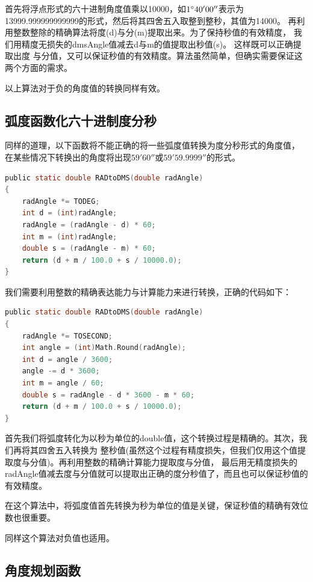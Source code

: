 首先将浮点形式的六十进制角度值乘以10000，如$1^\circ 40'00''$表示为
13999.999999999999的形式，然后将其四舍五入取整到整秒，其值为14000。
再利用整数整除的精确算法将度(d)与分(m)提取出来。为了保持秒值的有效精度，
我们用精度无损失的dmsAngle值减去d与m的值提取出秒值(s)。 这样既可以正确提取出度
与分值，又可以保证秒值的有效精度。算法虽然简单，但确实需要保证这两个方面的需求。

 以上算法对于负的角度值的转换同样有效。


\subsection{弧度函数化六十进制度分秒}

同样的道理，以下函数将不能正确的将一些弧度值转换为度分秒形式的角度值，
在某些情况下转换出的角度将出现$59'60''$或$59'59.9999''$的形式。

\begin{lstlisting}[language=C]
public static double RADtoDMS(double radAngle)
{
    radAngle *= TODEG;
    int d = (int)radAngle;
    radAngle = (radAngle - d) * 60;
    int m = (int)radAngle;
    double s = (radAngle - m) * 60;
    return (d + m / 100.0 + s / 10000.0);
}
\end{lstlisting}

我们需要利用整数的精确表达能力与计算能力来进行转换，正确的代码如下：

\begin{lstlisting}[language=C]
public static double RADtoDMS(double radAngle)
{
    radAngle *= TOSECOND;
    int angle = (int)Math.Round(radAngle); 
    int d = angle / 3600;
    angle -= d * 3600;
    int m = angle / 60;
    double s = radAngle - d * 3600 - m * 60;
    return (d + m / 100.0 + s / 10000.0);
}
\end{lstlisting}

首先我们将弧度转化为以秒为单位的double值，这个转换过程是精确的。其次，我们再将其四舍五入转换为
整秒值(虽然这个过程有精度损失，但我们仅用这个值提取度与分值)。再利用整数的精确计算能力提取度与分值，
最后用无精度损失的radAngle值减去度与分值就可以提取出正确的度分秒值了，而且也可以保证秒值的有效精度。

在这个算法中，将弧度值首先转换为秒为单位的值是关键，保证秒值的精确有效位数也很重要。

同样这个算法对负值也适用。

\subsection{角度规划函数}


